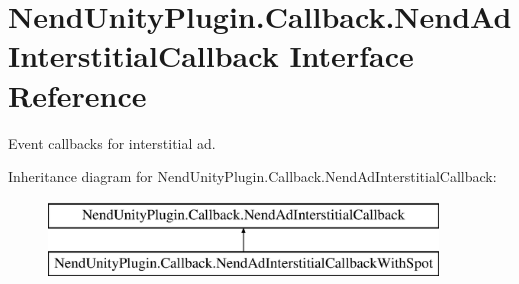 \hypertarget{interface_nend_unity_plugin_1_1_callback_1_1_nend_ad_interstitial_callback}{}\section{Nend\+Unity\+Plugin.\+Callback.\+Nend\+Ad\+Interstitial\+Callback Interface Reference}
\label{interface_nend_unity_plugin_1_1_callback_1_1_nend_ad_interstitial_callback}


Event callbacks for interstitial ad.  


Inheritance diagram for Nend\+Unity\+Plugin.\+Callback.\+Nend\+Ad\+Interstitial\+Callback\+:\begin{figure}[H]
\begin{center}
\leavevmode
\includegraphics[height=2.000000cm]{interface_nend_unity_plugin_1_1_callback_1_1_nend_ad_interstitial_callback}
\end{center}
\end{figure}
